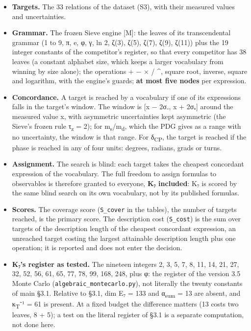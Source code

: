 \documentclass[11pt,a4paper]{article}
\begin{document}
\begin{itemize}
\tightlist
\item
  \textbf{Targets.} The 33 relations of the dataset (S3), with their measured values and uncertainties.
\item
  \textbf{Grammar.} The frozen Sieve engine {[}M{]}: the leaves of its transcendental grammar (1 to 9, π, e, φ, γ, ln 2, ζ(3), ζ(5), ζ(7), ζ(9), ζ(11)) plus the 19 integer constants of the competitor's register, so that every competitor has 38 leaves (a constant alphabet size, which keeps a larger vocabulary from winning by size alone); the operations + − × / \^{}, square root, inverse, square and logarithm, with the engine's guards; \textbf{at most five nodes} per expression.
\item
  \textbf{Concordance.} A target is reached by a vocabulary if one of its expressions falls in the target's window. The window is {[}x − 2σ₋, x + 2σ₊{]} around the measured value x, with asymmetric uncertainties kept asymmetric (the Sieve's frozen rule τ\textsubscript{z} = 2); for m\textsubscript{s}/m\textsubscript{d}, which the PDG gives as a range with no uncertainty, the window is that range. For δ\textsubscript{CP}, the target is reached if the phase is reached in any of four units: degrees, radians, grads or turns.
\item
  \textbf{Assignment.} The search is blind: each target takes the cheapest concordant expression of the vocabulary. The full freedom to assign formulas to observables is therefore granted to everyone, \textbf{K₇ included}: K₇ is scored by the same blind search on its own vocabulary, not by its published formulas.
\item
  \textbf{Scores.} The coverage score (\texttt{S\_\allowbreak{}cover} in the tables), the number of targets reached, is the primary score. The description cost (\texttt{S\_\allowbreak{}cost}) is the sum over targets of the description length of the cheapest concordant expression, an unreached target costing the largest attainable description length plus one operation; it is reported and does not enter the decision.
\item
  \textbf{K₇'s register as tested.} The nineteen integers 2, 3, 5, 7, 8, 11, 14, 21, 27, 32, 52, 56, 61, 65, 77, 78, 99, 168, 248, plus φ: the register of the version 3.5 Monte Carlo (\texttt{algebraic\_\allowbreak{}montecarlo.\allowbreak{}py}), not literally the twenty constants of main §3.1. Relative to §3.1, dim E₇ = 133 and α\textsubscript{sum} = 13 are absent, and κ\textsubscript{T}⁻¹ = 61 is present. At a fixed budget the difference matters (13 costs two leaves, 8 + 5); a test on the literal register of §3.1 is a separate computation, not done here.

\end{itemize}
\end{document}
